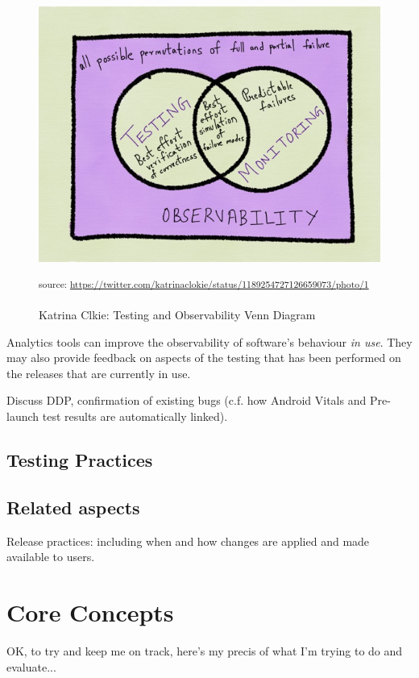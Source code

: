\begin{figure}
    \centering
    \includegraphics[width=\textwidth]{images/katrinaclokie_venndiagram_testing_and_observability_from_twitter.jpg}
    \caption{Katrina Clkie: Testing and Observability Venn Diagram}
    \small\textsuperscript{source:  \url{https://twitter.com/katrinaclokie/status/1189254727126659073/photo/1}}
    \label{fig:katrinaclokie_venndiagram_testing_and_observability_from_twitter}
\end{figure}

Analytics tools can improve the observability of software's behaviour \emph{in use}. They may also provide feedback on aspects of the testing that has been performed on the releases that are currently in use.

Discuss DDP, confirmation of existing bugs (c.f. how Android Vitals and Pre-launch test results are automatically linked).

\subsection{Testing Practices}

\subsection{Related aspects}

Release practices: including when and how changes are applied and made available to users. 

\section{Core Concepts}
OK, to try and keep me on track, here's my precis of what I'm trying to do and evaluate...

